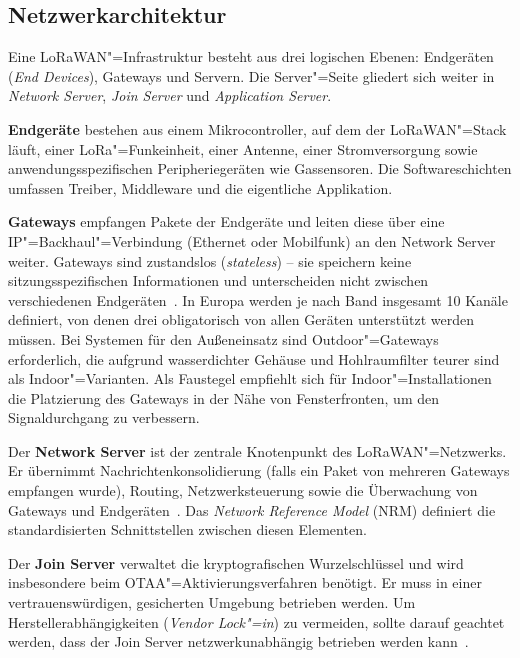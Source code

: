 \subsection{Netzwerkarchitektur}
\label{subsec:netzwerkarchitektur}

Eine LoRaWAN"=Infrastruktur besteht aus drei logischen Ebenen: Endgeräten
(\textit{End Devices}), Gateways und Servern. Die Server"=Seite gliedert sich
weiter in \textit{Network Server}, \textit{Join Server} und
\textit{Application Server}.

\textbf{Endgeräte} bestehen aus einem Mikrocontroller, auf dem der LoRaWAN"=Stack
läuft, einer LoRa"=Funkeinheit, einer Antenne, einer Stromversorgung sowie
anwendungsspezifischen Peripheriegeräten wie Gassensoren. Die Softwareschichten
umfassen Treiber, Middleware und die eigentliche Applikation.

\textbf{Gateways} empfangen Pakete der Endgeräte und leiten diese über eine
IP"=Backhaul"=Verbindung (Ethernet oder Mobilfunk) an den Network Server weiter.
Gateways sind zustandslos (\textit{stateless}) -- sie speichern keine
sitzungsspezifischen Informationen und unterscheiden nicht zwischen verschiedenen
Endgeräten~\cite{lorawan_spec}. In Europa werden je nach Band insgesamt 10 Kanäle
definiert, von denen drei obligatorisch von allen Geräten unterstützt werden müssen.
Bei Systemen für den Außeneinsatz sind Outdoor"=Gateways erforderlich, die aufgrund
wasserdichter Gehäuse und Hohlraumfilter teurer sind als Indoor"=Varianten. Als
Faustegel empfiehlt sich für Indoor"=Installationen die Platzierung des Gateways in
der Nähe von Fensterfronten, um den Signaldurchgang zu verbessern.

Der \textbf{Network Server} ist der zentrale Knotenpunkt des LoRaWAN"=Netzwerks. Er
übernimmt Nachrichtenkonsolidierung (falls ein Paket von mehreren Gateways empfangen
wurde), Routing, Netzwerksteuerung sowie die Überwachung von Gateways und
Endgeräten~\cite{lorawan_spec}. Das \textit{Network Reference Model} (NRM) definiert
die standardisierten Schnittstellen zwischen diesen Elementen.

Der \textbf{Join Server} verwaltet die kryptografischen Wurzelschlüssel und wird
insbesondere beim \ac{OTAA}"=Aktivierungsverfahren benötigt. Er muss in einer
vertrauenswürdigen, gesicherten Umgebung betrieben werden. Um Herstellerabhängigkeiten
(\textit{Vendor Lock"=in}) zu vermeiden, sollte darauf geachtet werden, dass der Join
Server netzwerkunabhängig betrieben werden kann~\cite{semtech_lora_basics}.

